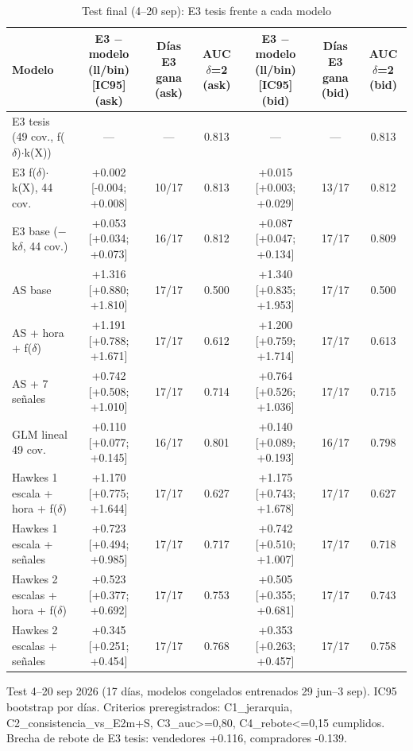 \begin{table}[ht]\centering\small
\caption{Test final (4--20 sep): E3 tesis frente a cada modelo}
\begin{tabular}{lcccccc}
\toprule
Modelo & E3 $-$ modelo (ll/bin) [IC95] (ask) & Días E3 gana (ask) & AUC $\delta$=2 (ask) & E3 $-$ modelo (ll/bin) [IC95] (bid) & Días E3 gana (bid) & AUC $\delta$=2 (bid) \\
\midrule
E3 tesis (49 cov., f($\delta$)$\cdot$k(X)) & — & — & 0.813 & — & — & 0.813 \\
E3 f($\delta$)$\cdot$k(X), 44 cov. & +0.002 [-0.004; +0.008] & 10/17 & 0.813 & +0.015 [+0.003; +0.029] & 13/17 & 0.812 \\
E3 base ($-$k$\delta$, 44 cov.) & +0.053 [+0.034; +0.073] & 16/17 & 0.812 & +0.087 [+0.047; +0.134] & 17/17 & 0.809 \\
AS base & +1.316 [+0.880; +1.810] & 17/17 & 0.500 & +1.340 [+0.835; +1.953] & 17/17 & 0.500 \\
AS + hora + f($\delta$) & +1.191 [+0.788; +1.671] & 17/17 & 0.612 & +1.200 [+0.759; +1.714] & 17/17 & 0.613 \\
AS + 7 señales & +0.742 [+0.508; +1.010] & 17/17 & 0.714 & +0.764 [+0.526; +1.036] & 17/17 & 0.715 \\
GLM lineal 49 cov. & +0.110 [+0.077; +0.145] & 16/17 & 0.801 & +0.140 [+0.089; +0.193] & 16/17 & 0.798 \\
Hawkes 1 escala + hora + f($\delta$) & +1.170 [+0.775; +1.644] & 17/17 & 0.627 & +1.175 [+0.743; +1.678] & 17/17 & 0.627 \\
Hawkes 1 escala + señales & +0.723 [+0.494; +0.985] & 17/17 & 0.717 & +0.742 [+0.510; +1.007] & 17/17 & 0.718 \\
Hawkes 2 escalas + hora + f($\delta$) & +0.523 [+0.377; +0.692] & 17/17 & 0.753 & +0.505 [+0.355; +0.681] & 17/17 & 0.743 \\
Hawkes 2 escalas + señales & +0.345 [+0.251; +0.454] & 17/17 & 0.768 & +0.353 [+0.263; +0.457] & 17/17 & 0.758 \\
\bottomrule
\end{tabular}
\par\footnotesize Test 4–20 sep 2026 (17 días, modelos congelados entrenados 29 jun–3 sep). IC95 bootstrap por días. Criterios preregistrados: C1_jerarquia, C2_consistencia_vs_E2m+S, C3_auc>=0,80, C4_rebote<=0,15 cumplidos. Brecha de rebote de E3 tesis: vendedores +0.116, compradores -0.139.
\end{table}
